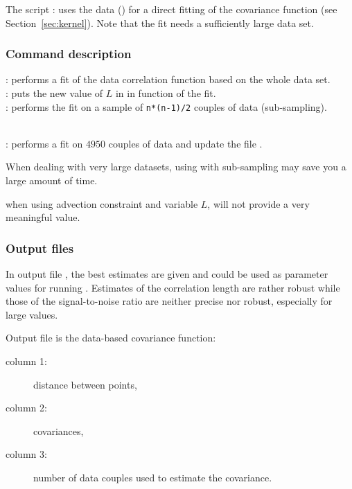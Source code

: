 The script : uses the data () for a direct fitting of the covariance function (see Section~\ref{sec:kernel}). Note that the fit needs a sufficiently large data set.

\subsubsection{Command description}

 \qquad: performs a fit of the data correlation function based on the whole data set. \\
 \qquad: puts the new value of $L$ in  in function of the fit.\\
 \qquad: performs the fit on a sample of \texttt{n*(n-1)/2} couples of data (sub-sampling). 

\example\\
: performs a fit on $4950$ couples of data and update the file .

\btips
When dealing with very large datasets, using  with sub-sampling may save you a large amount of time.
\etips

\info when using advection  constraint and variable $L$,  will not provide a very meaningful value.

\subsubsection{Output files}

In output file , the best estimates are given and could be used as parameter values for running \diva.
Estimates of the correlation length are rather robust while those of the signal-to-noise ratio are neither precise nor robust, especially for large values.

Output file  is the data-based covariance function:
\begin{description}
\item[column 1:] distance between points,
\item[column 2:] covariances, 
\item[column 3:] number of data couples used to estimate the covariance. 
\end{description} 

